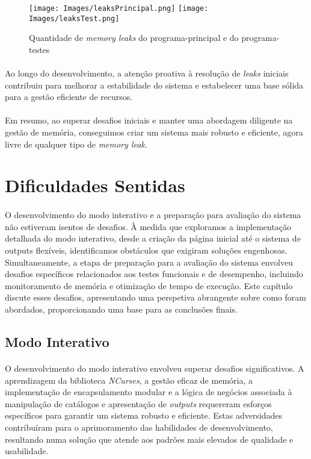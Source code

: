 \documentclass{article}
\begin{document}
\begin{figure}[H]
\begin{center}
	\texttt{[image: Images/leaksPrincipal.png]}
        \quad\texttt{[image: Images/leaksTest.png]} 
        \caption{Quantidade de \textit{memory leaks} do programa-principal e do programa-testes}
\end{center}
\end{figure}

\paragraph{}Ao longo do desenvolvimento, a atenção proativa à resolução de \textit{leaks} iniciais contribuiu para melhorar a estabilidade do sistema e estabelecer uma base sólida para a gestão eficiente de recursos.
\vspace{-0.3cm}
\paragraph{}Em resumo, ao superar desafios iniciais e manter uma abordagem diligente na gestão de memória, conseguimos criar um sistema mais robusto e eficiente, agora livre de qualquer tipo de \textit{memory leak}.

\section{Dificuldades Sentidas}
\paragraph{}O desenvolvimento do modo interativo e a preparação para avaliação do sistema não estiveram isentos de desafios. À medida que exploramos a implementação detalhada do modo interativo, desde a criação da página inicial até o sistema de outputs flexíveis, identificamos obstáculos que exigiram soluções engenhosas. Simultaneamente, a etapa de preparação para a avaliação do sistema envolveu desafios específicos relacionados aos testes funcionais e de desempenho, incluindo monitoramento de memória e otimização de tempo de execução. Este capítulo discute esses desafios, apresentando uma perspetiva abrangente sobre como foram abordados, proporcionando uma base para as conclusões finais.
\subsection{Modo Interativo}
\paragraph{}O desenvolvimento do modo interativo envolveu superar desafios significativos. A aprendizagem da biblioteca \textit{NCurses}, a gestão eficaz de memória, a implementação de encapsulamento modular e a lógica de negócios associada à manipulação de catálogos e apresentação de \textit{outputs} requereram esforços específicos para garantir um sistema robusto e eficiente. Estas adversidades contribuíram para o aprimoramento das habilidades de desenvolvimento, resultando numa solução que atende aos padrões mais elevados de qualidade e usabilidade.
\end{document}
